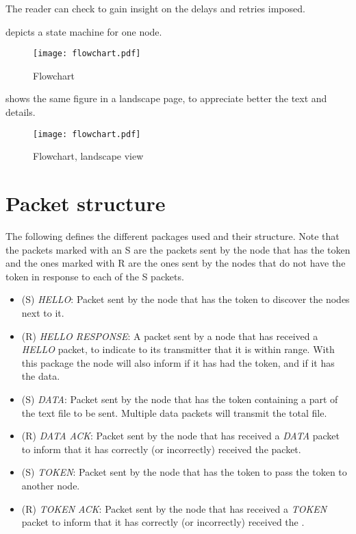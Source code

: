 The reader can check  to gain insight on the delays and retries imposed.


 depicts a state machine for one node.
\begin{figure}[H] \centering
	\texttt{[image: flowchart.pdf]}
	\caption{Flowchart}
	\label{fig:flowchart-pdf}
\end{figure}

 shows the same figure in a landscape page, to appreciate better the text and details.
\clearpage
\thispagestyle{empty}
\begin{landscape}

\begin{figure}[H] \centering
	\texttt{[image: flowchart.pdf]}
	\caption{Flowchart, landscape view}
	\label{fig:flowchart-pdf-2}
\end{figure}

\end{landscape}

\restoregeometry



\chapter{Packet structure}
The following defines the different packages used and their structure. Note that the packets marked with an S are the packets sent by the node that has the token and the ones marked with R are the ones sent by the nodes that do not have the token in response to each of the S packets.
\begin{itemize}
	\item (S) \textit{HELLO}: Packet sent by the node that has the token to discover the nodes next to it.
	\item (R) \textit{HELLO RESPONSE}: A packet sent by a node that has received a \textit{HELLO} packet, to indicate to its transmitter that it is within range. With this package the node will also inform if it has had the token, and if it has the data.
	\item (S) \textit{DATA}: Packet sent by the node that has the token containing a part of the text file to be sent. Multiple data packets will transmit the total file.
	\item (R) \textit{DATA ACK}: Packet sent by the node that has received a \textit{DATA} packet to inform that it has correctly (or incorrectly) received the packet.
	\item (S) \textit{TOKEN}: Packet sent by the node that has the token to pass the token to another node.
	\item (R) \textit{TOKEN ACK}: Packet sent by the node that has received a \textit{TOKEN} packet to inform that it has correctly (or incorrectly) received the .
\end{itemize}

